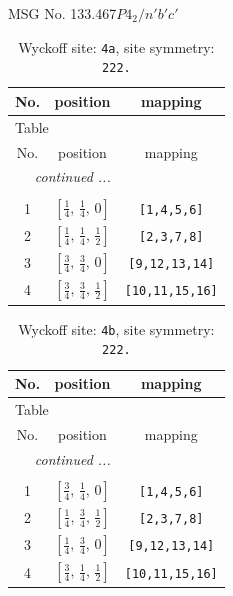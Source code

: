 \documentclass[fleqn,8pt]{jsarticle}
\begin{document}
\setcounter{MaxMatrixCols}{32}

\renewcommand{\tablename}{Table~}
\renewcommand{\figurename}{Figure~}
\begin{center}
\LARGE
MSG No. 133.467\quad$P4_{2}/n'b'c'$
\end{center}
\renewcommand{\arraystretch}{1.2}
\begin{longtable}{ccc}
\caption{Wyckoff site: {\tt 4a}, site symmetry: {\tt 222.}}
 \\
 \hline \hline
No. & position & mapping \\ \hline \endfirsthead

\multicolumn{2}{l}{\tablename\ \thetable{}} \\
 \hline \hline
No. & position & mapping \\ \hline \endhead

 \hline \hline
\multicolumn{2}{r}{\footnotesize\it continued ...} \\ \endfoot

 \hline \hline
\multicolumn{2}{r}{} \\ \endlastfoot

1 & $\left[ \frac{1}{4},\, \frac{1}{4},\, 0 \right]$ & {\tt [1,4,5,6]} \\ \hline
2 & $\left[ \frac{1}{4},\, \frac{1}{4},\, \frac{1}{2} \right]$ & {\tt [2,3,7,8]} \\ \hline
3 & $\left[ \frac{3}{4},\, \frac{3}{4},\, 0 \right]$ & {\tt [9,12,13,14]} \\ \hline
4 & $\left[ \frac{3}{4},\, \frac{3}{4},\, \frac{1}{2} \right]$ & {\tt [10,11,15,16]} \\
\end{longtable}
\renewcommand{\arraystretch}{1.2}
\begin{longtable}{ccc}
\caption{Wyckoff site: {\tt 4b}, site symmetry: {\tt 222.}}
 \\
 \hline \hline
No. & position & mapping \\ \hline \endfirsthead

\multicolumn{2}{l}{\tablename\ \thetable{}} \\
 \hline \hline
No. & position & mapping \\ \hline \endhead

 \hline \hline
\multicolumn{2}{r}{\footnotesize\it continued ...} \\ \endfoot

 \hline \hline
\multicolumn{2}{r}{} \\ \endlastfoot

1 & $\left[ \frac{3}{4},\, \frac{1}{4},\, 0 \right]$ & {\tt [1,4,5,6]} \\ \hline
2 & $\left[ \frac{1}{4},\, \frac{3}{4},\, \frac{1}{2} \right]$ & {\tt [2,3,7,8]} \\ \hline
3 & $\left[ \frac{1}{4},\, \frac{3}{4},\, 0 \right]$ & {\tt [9,12,13,14]} \\ \hline
4 & $\left[ \frac{3}{4},\, \frac{1}{4},\, \frac{1}{2} \right]$ & {\tt [10,11,15,16]} \\
\end{longtable}
\end{document}
